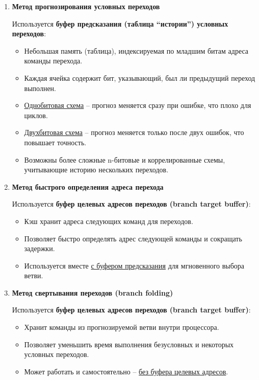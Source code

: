 	\begin{enumerate}[leftmargin=1.35em]
		\item \textbf{Метод прогнозирования условных переходов}
		\par
		Используется \textbf{буфер предсказания (таблица ``истории'') условных переходов}:
		\begin{itemize}
			\item Небольшая память (таблица), индексируемая по младшим битам адреса команды перехода.
			\item Каждая ячейка содержит бит, указывающий, был ли предыдущий переход выполнен.
			\item \uline{Однобитовая схема} -- прогноз меняется сразу при ошибке, что плохо для циклов.
			\item \uline{Двухбитовая схема} -- прогноз меняется только после двух ошибок, что повышает точность.
			\item Возможны более сложные n-битовые и коррелированные схемы, учитывающие историю нескольких переходов.
		\end{itemize}
		
		\item \textbf{Метод быстрого определения адреса перехода}
		\par
		Используется \textbf{буфер целевых адресов переходов (branch target buffer)}:
		\begin{itemize}
			\item Кэш хранит адреса следующих команд для переходов.
			\item Позволяет быстро определять адрес следующей команды и сокращать задержки.
			\item Используется вместе \uline{с буфером предсказания} для мгновенного выбора ветви.
		\end{itemize}
		
		\item \textbf{Метод свертывания переходов (branch folding)}
		\par
		Используется \textbf{буфер целевых адресов переходов (branch target buffer)}:
		\begin{itemize}
			\item Хранит команды из прогнозируемой ветви внутри процессора.
			\item Позволяет уменьшить время выполнения безусловных и некоторых условных переходов.
			\item Может работать и самостоятельно -- \uline{без буфера целевых адресов}.
		\end{itemize}
		

\end{enumerate}

